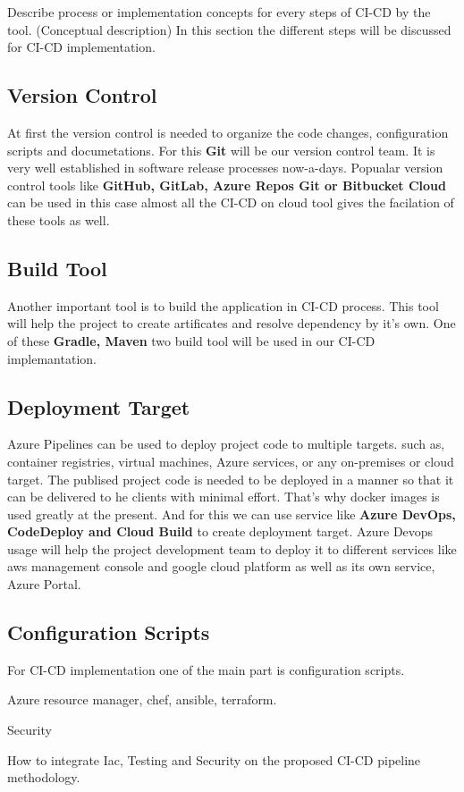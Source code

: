 Describe process or implementation concepts for every steps of CI-CD by the tool. (Conceptual description)
In this section the different steps will be discussed for CI-CD implementation.
\subsection{Version Control}
At first the version control is needed to organize the code changes, configuration scripts and documetations. For this \textbf{Git} will be our version control team. It is very well established in software release processes now-a-days. Popualar version control tools like \textbf{GitHub, GitLab, Azure Repos Git or Bitbucket Cloud} can be used in this case almost all the CI-CD on cloud tool gives the facilation of these tools as well.
\subsection{Build Tool}
Another important tool is to build the application in CI-CD process. This tool will help the project to create artificates and resolve dependency by it's own. One of these \textbf{Gradle, Maven} two build tool will be used in our CI-CD implemantation.
\subsection{Deployment Target}
Azure Pipelines can be used to deploy project code to multiple targets. such as, container registries, virtual machines, Azure services, or any on-premises or cloud target.
The publised project code is needed to be deployed in a manner so that it can be delivered to he clients with minimal effort. That's why docker images is used greatly at the present. And for this we can use service like \textbf{Azure DevOps, CodeDeploy and Cloud Build} to create deployment target. Azure Devops usage will help the project development team to deploy it to different services like aws management console and google cloud platform as well as its own service, Azure Portal.
\subsection{Configuration Scripts}
For CI-CD implementation one of the main part is configuration scripts.

Azure resource manager, chef, ansible, terraform.

Security

How to integrate Iac, Testing and Security on the proposed CI-CD pipeline methodology.